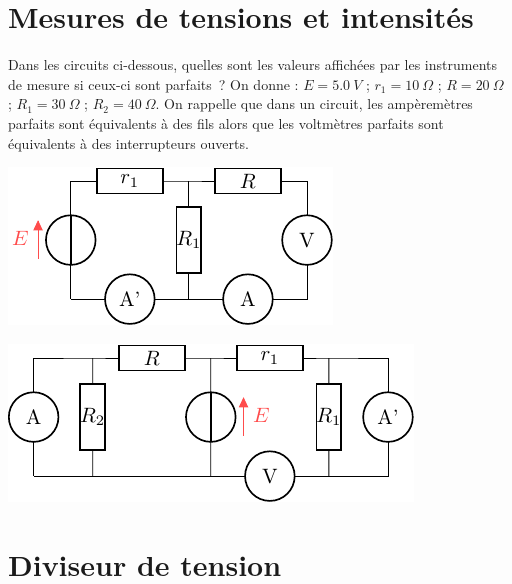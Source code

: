 \documentclass[../../main/main.tex]{subfiles}
\begin{document}
\section{Mesures de tensions et intensités}

Dans les circuits ci-dessous, quelles sont les valeurs affichées par les
instruments de mesure si ceux-ci sont parfaits~? On donne : $E = \SI{5,0}{V}$ ;
$r_1 = \SI{10}{\Omega}$ ; $R = \SI{20}{\Omega}$ ; $R_1 = \SI{30}{\Omega}$ ; $R_2
	= \SI{40}{\Omega}$. On rappelle que dans un circuit, les ampèremètres parfaits
sont équivalents à des fils alors que les voltmètres parfaits sont équivalents à
des interrupteurs ouverts.

\begin{minipage}{0.48\linewidth}
	\includegraphics[width=\linewidth]{mes_iu_a-plain}
\end{minipage}
\hfill
\begin{minipage}{0.48\linewidth}
	\includegraphics[width=\linewidth]{mes_iu_b-plain}
\end{minipage}

\section{Diviseur de tension}
\end{document}
